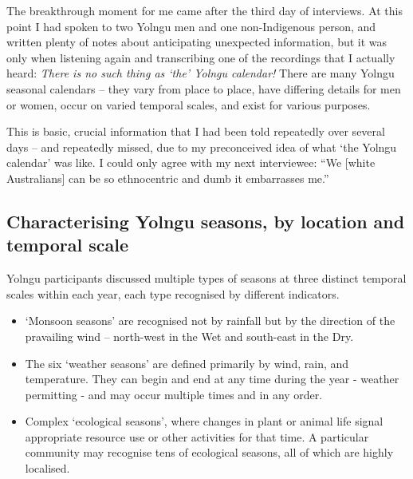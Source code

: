The breakthrough moment for me came after the third day of interviews.
At this point I had spoken to two Yolngu men and one non-Indigenous
person, and written plenty of notes about anticipating unexpected
information, but it was only when listening again and transcribing
one of the recordings that I actually heard:  \emph{There is no such
thing as `the' Yolngu calendar!}  There are many Yolngu seasonal
calendars -- they vary from place to place, have differing details for
men or women, occur on varied temporal scales, and exist for various
purposes.

This is basic, crucial information that I had been told repeatedly over
several days -- and repeatedly missed, due to my preconceived idea of what
`the Yolngu calendar' was like.  I could only agree with my next interviewee:
``We [white Australians] can be so ethnocentric and dumb it embarrasses me.''



\subsection{Characterising Yolngu seasons, by location and temporal scale}
\label{subsec:three-seasons-scales}

Yolngu participants discussed multiple types of seasons at three distinct temporal scales
within each year, each type recognised by different indicators.
\begin{itemize}
\item `Monsoon seasons' are recognised not by rainfall but by the direction
        of the pravailing wind -- north-west in the Wet and south-east in the Dry.
\item The six `weather seasons' are defined primarily by wind, rain, and temperature.
        They can begin and end at any time during the year - weather permitting -
        and may occur multiple times and in any order.
\item Complex `ecological seasons', where changes in plant or animal life
        signal appropriate resource use or other activities for that time.
        A particular community may recognise tens of ecological seasons,
        all of which are highly localised.
\end{itemize}

